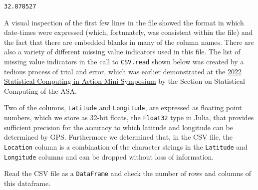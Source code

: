 \documentclass[
  12pt]{article}
\begin{document}
\begin{verbatim}
32.878527
\end{verbatim}

A visual inspection of the first few lines in the file showed the format
in which date-times were expressed (which, fortunately, was consistent
within the file) and the fact that there are embedded blanks in many of
the column names. There are also a variety of different missing value
indicators used in this file. The list of missing value indicators in
the call to \texttt{CSV.read} shown below was created by a tedious
process of trial and error, which was earlier demonstrated at the
\href{https://asa-ssc.github.io/minisymp2022/}{2022 Statistical
Computing in Action Mini-Symposium} by the Section on Statistical
Computing of the ASA.

Two of the columns, \texttt{Latitude} and \texttt{Longitude}, are
expressed as floating point numbers, which we store as 32-bit floats,
the \texttt{Float32} type in Julia, that provides sufficient precision
for the accuracy to which latitude and longitude can be determined by
GPS. Furthermore we determined that, in the CSV file, the
\texttt{Location} column is a combination of the character strings in
the \texttt{Latitude} and \texttt{Longitude} columns and can be dropped
without loss of information.

Read the CSV file as a \texttt{DataFrame} and check the number of rows
and columns of this dataframe.
\end{document}
